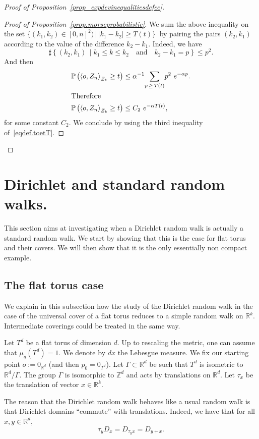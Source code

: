 \documentclass[AHL,Unicode,longabstracts,published]{cedram}
\newcommand{\Z}{\mathbb{Z}}
\newcommand{\PP}{\mathbb{P}}
\newcommand{\RR}{\mathbb{R}}
\newcommand{\somme}[1]{\underset{#1}{\sum}}
\newcommand{\G}{\Gamma}
\begin{document}
\begin{proof}[{Proof of Proposition~\ref{prop_expdevinequalitiesdefec}}]
\begin{proof}[{Proof of Proposition~\ref{prop.morseprobabilistic}}]
We sum the above inequality on the set $ \{ (k_1,k_2) \in [0,n]^2)\, | \, |k_1-k_2|\geq T(t)\} \ $ by pairing the pairs $(k_2,k_1)$ according to the value of the difference $k_2 -k_1$. Indeed, we have
\[
\sharp \left\{ \left(k_2,k_1\right) \, \middle| k_1 \le k \le k_2 \quad \text{and} \quad k_2 - k_1 = p \right\} \le p^2 .
\]
And then
\begin{align*}
\PP\left(\left\langle o, Z_{n}\right\rangle_{Z_k} \geq t\right) &\le \alpha^{-1} \somme{p\,\ge\,T(t)} p^2 \ e^{- \alpha p } .
\\
\intertext{Therefore}
\PP\left(\left\langle o, Z_{n}\right\rangle_{Z_k} \geq t\right) &\le C_2 \ e^{- \alpha T(t) } ,
\end{align*}
for some constant $C_2$. We conclude by using the third inequality of~\eqref{eqdef.toetT}.
\end{proof}
\end{proof}



\appendix



\section{Dirichlet and standard random walks.}\label{sec.dirichletstandard}

This section aims at investigating when a Dirichlet random walk is actually a standard random walk. We start by showing that this is the case for flat torus and their covers. We will then show that it is the only essentially non compact example.

\subsection{The flat torus case} 
We explain in this subsection how the study of the Dirichlet random walk in the case of the universal cover of a flat torus reduces to a simple random walk on $\RR^k$. Intermediate coverings could be treated in the same way. 

Let $T^d$ be a flat torus of dimension $d$. Up to rescaling the metric, one can assume that $\mu_g(T^d) =1$. We denote by $dx$ the Lebesgue measure. We fix our starting point $o := 0_{\RR^d}$ (and then $p_0 = 0_{T^d}$). Let $\G \subset \RR^d$ be such that $T^d$ is isometric to $\RR^d/\G$. The group $\G$ is isomorphic to $\Z^d$ and acts by translations on $\RR^d$. Let $\tau_x$ be the translation of vector $x\in \RR^k$.

The reason that the Dirichlet random walk behaves like a usual random walk is that Dirichlet domains ``commute'' with translations. Indeed, we have that for all $x,y \in \RR^d$,
\[
\tau_y D_x = D_{\tau_y x}= D_{y+x}.
\]
\end{document}
